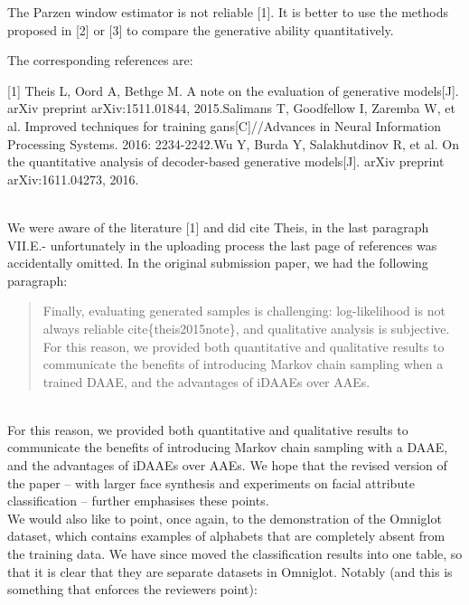 \documentclass{article}
\begin{document}
{\color{blue}
The Parzen window estimator is not reliable [1]. It is better to use the methods proposed in [2] or [3] to compare the generative ability quantitatively.

The corresponding references are:

[1] Theis L, Oord A, Bethge M. A note on the evaluation of generative models[J]. arXiv preprint arXiv:1511.01844, 2015.\newline
[2] Salimans T, Goodfellow I, Zaremba W, et al. Improved techniques for training gans[C]//Advances in Neural Information Processing Systems. 2016: 2234-2242.\newline
[3] Wu Y, Burda Y, Salakhutdinov R, et al. On the quantitative analysis of decoder-based generative models[J]. arXiv preprint arXiv:1611.04273, 2016.\newline
}
\\

We were aware of the literature [1] and did cite Theis, in the last paragraph VII.E.- unfortunately in the uploading process the last page of references was accidentally omitted. In the original submission paper, we had the following paragraph:

\begin{quote} Finally, evaluating generated samples is challenging: log-likelihood is not always reliable cite\{theis2015note\}, and qualitative analysis is subjective. For this reason, we provided both quantitative and qualitative results to communicate the benefits of introducing Markov chain sampling when a trained DAAE, and the advantages of iDAAEs over AAEs. 
\end{quote}\\

For this reason, we provided both quantitative and qualitative results to communicate the benefits of introducing Markov chain sampling with a DAAE, and the advantages of iDAAEs over AAEs.  We hope that the revised version of the paper -- with larger face synthesis and experiments on {\color{red} facial attribute} classification -- further emphasises these points.\\

We would also like to point, once again, to the demonstration of the Omniglot dataset, which contains examples of alphabets that are completely absent from the training data. We have since {\color{red} moved} the classification results into one table, so that it is clear that {\color{red} they} are separate datasets in Omniglot. Notably (and this is something that enforces the reviewers point):
\end{document}

